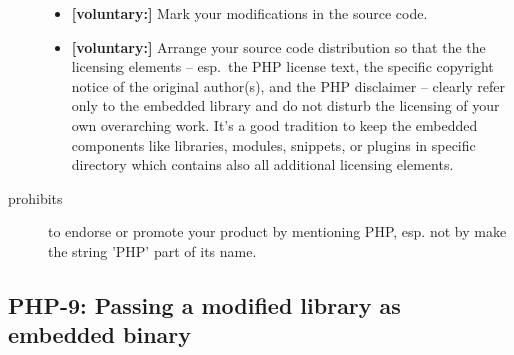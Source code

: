 \begin{description}
\begin{itemize}
  \item \textbf{[voluntary:]} Mark your modifications in the source code.
  
  \item \textbf{[voluntary:]} Arrange your source code distribution so that the
  the licensing elements -- esp.\ the PHP license text, the specific copyright
  notice of the original author(s), and the PHP disclaimer -- clearly refer
  only to the embedded library and do not disturb the licensing of your own
  overarching work. It's a good tradition to keep the embedded components like
  libraries, modules, snippets, or plugins in specific directory which contains
  also all additional licensing elements.
  
\end{itemize}

\item[prohibits] to endorse or promote your product by mentioning PHP, esp. not
by make the string 'PHP' part of its name.

\end{description}


\subsection{PHP-9: Passing a modified library as embedded binary}

